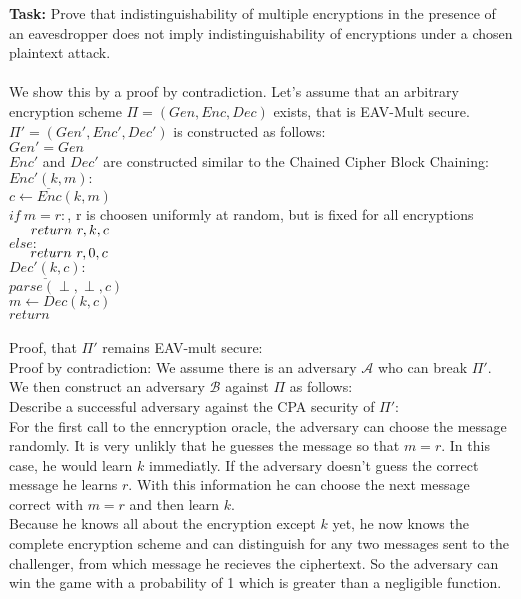 \textbf{Task:} Prove that indistinguishability of multiple encryptions in the presence of an eavesdropper does
not imply indistinguishability of encryptions under a chosen plaintext attack.\\
\\
We show this by a proof by contradiction. Let's assume that an arbitrary encryption scheme \(\Pi = (Gen, Enc, Dec)\) exists, that is EAV-Mult secure.\\
\(\Pi' = (Gen', Enc', Dec')\) is constructed as follows:\\
\(Gen' = Gen\)\\
\(Enc'\) and \(Dec'\) are constructed similar to the Chained Cipher Block Chaining: \\
\(\underline{Enc'(k, m)}:\)\\
\(c \leftarrow Enc(k, m)\)\\
\(if\ m = r:\), r is choosen uniformly at random, but is fixed for all encryptions\\
\(\indent return\ r,k,c\)\\
\(else:\)\\
\(\indent return\ r,0,c\)\\


\noindent \(\underline{Dec'(k, c)}:\)\\
\(parse(\perp, \perp, c)\)\\
\(m \leftarrow  Dec(k,c)\)\\
\(return\)\\
\\
Proof, that \(\Pi'\) remains EAV-mult secure:\\
Proof by contradiction: We assume there is an adversary \(\mathcal{A}\) who can break \(\Pi'\). We then construct an adversary \(\mathcal{B}\) against \(\Pi\) as follows:
\\
Describe a successful adversary against the CPA security of \(\Pi'\):\\
For the first call to the enncryption oracle, the adversary can choose the message randomly. It is very unlikly that he guesses the message so that \(m = r\). In this case, he would learn \(k\) immediatly. If the adversary doesn't guess the correct message he learns \(r\). With this information he can choose the next message correct with \(m = r\) and then learn \(k\). \\
Because he knows all about the encryption except \(k\) yet, he now knows the complete encryption scheme and can distinguish for any two messages sent to the challenger, from which message he recieves the ciphertext. So the adversary can win the game with a probability of 1 which is greater than a negligible function.